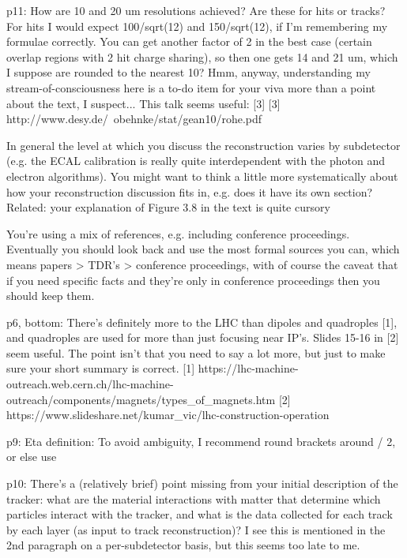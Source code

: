 
p11:  How are 10 and 20 um resolutions achieved?  Are these for hits or tracks?  
For hits I would expect 100/sqrt(12) and 150/sqrt(12), if I'm remembering my formulae correctly.  
You can get another factor of 2 in the best case (certain overlap regions with 2 hit charge sharing), 
so then one gets 14 and 21 um, which I suppose are rounded to the nearest 10?   
Hmm, anyway, understanding my stream-of-consciousness here is a to-do item for your viva more than a point about the text, I suspect... 
This talk seems useful: [3]
[3] http://www.desy.de/~obehnke/stat/gean10/rohe.pdf

In general the level at which you discuss the reconstruction varies by subdetector 
(e.g. the ECAL calibration is really quite interdependent with the photon and electron algorithms).  
You might want to think a little more systematically about how your reconstruction discussion fits in, e.g. does it have its own section?  
Related: your explanation of Figure 3.8 in the text is quite cursory

You're using a mix of references, e.g. including conference proceedings. 
Eventually you should look back and use the most formal sources you can, which means papers > TDR's > conference proceedings, 
with of course the caveat that if you need specific facts and they're only in conference proceedings then you should keep them.



p6, bottom:  There's definitely more to the LHC than dipoles and quadroples [1], and quadroples are used for more than just focusing near IP's.  
Slides 15-16 in [2] seem useful.  
The point isn't that you need to say a lot more, but just to make sure your short summary is correct. %
[1] https://lhc-machine-outreach.web.cern.ch/lhc-machine-outreach/components/magnets/types_of_magnets.htm 
[2] https://www.slideshare.net/kumar_vic/lhc-construction-operation

p9: Eta definition: To avoid ambiguity, I recommend round brackets around \theta / 2, or else use 

p10: There's a (relatively brief) point missing from your initial description of the tracker: 
what are the material interactions with matter that determine which particles interact with the tracker, 
and what is the data collected for each track by each layer (as input to track reconstruction)?    
I see this is mentioned in the 2nd paragraph on a per-subdetector basis, but this seems too late to me.


